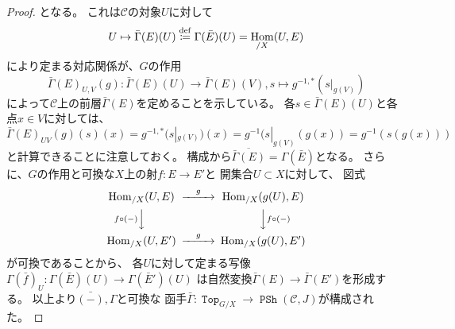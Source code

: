 \documentclass[uplatex]{jsarticle}
\theoremstyle{definition}
\DeclareMathOperator{\Hom}{Hom}
\def\mcC{\mathcal{C}}
\newcommand{\dfn}{\overset{\mathrm{\tiny def}}{\coloneqq}}
\DeclareMathOperator{\sfTop}{\mathtt{Top}}
\DeclareMathOperator{\PSh}{\mathtt{PSh}}
\begin{document}
\begin{proof}
  となる。
  これは\(\mcC\)の対象\(U\)に対して
  \[
  U\mapsto \bar{\Gamma}(E)(U) \dfn \Gamma(\bar{E})(U) = \Hom_{/X}(U,E)
  \]
  により定まる対応関係が、\(G\)の作用
  \[
  \bar{\Gamma}(E)_{U,V}(g):
  \bar{\Gamma}(E)(U) \to \bar{\Gamma}(E)(V), s\mapsto g^{-1,*}(s|_{g(V)})
  \]
  によって\(\mcC\)上の前層\(\bar{\Gamma}(E)\)を定めることを示している。
  各\(s\in \bar{\Gamma}(E)(U)\)と各点\(x\in V\)に対しては、
  \begin{equation}
    \label{eq: prob: 0.9}
    \bar{\Gamma}(E)_{UV}(g)(s)(x) = g^{-1,*}(s|_{g(V)})(x)
    = g^{-1}(s|_{g(V)}(g(x)) = g^{-1}(s(g(x)))
    \tag{\(\dagger\)}
  \end{equation}
  と計算できることに注意しておく。
  構成から\(\overline{\bar{\Gamma}(E)} = \Gamma(\bar{E})\)となる。
  さらに、\(G\)の作用と可換な\(X\)上の射\(f:E\to E'\)と
  開集合\(U\subset X\)に対して、
  図式
  \[
  \begin{CD}
    \Hom_{/X}(U,E) @>g>> \Hom_{/X}(g(U),E) \\
    @V {f\circ(-)} VV @VV {f\circ(-)} V \\
    \Hom_{/X}(U,E') @>g>> \Hom_{/X}(g(U),E')
  \end{CD}
  \]
  が可換であることから、
  各\(U\)に対して定まる写像
  \(\Gamma(\bar{f})_U:\Gamma(\bar{E})(U) \to \Gamma(\bar{E}')(U)\)
  は自然変換\(\bar{\Gamma}(E)\to \bar{\Gamma}(E')\)を形成する。
  以上より\(\bar{(-)}, \Gamma\)と可換な
  函手\(\bar{\Gamma}:\sfTop_{G/X} \to \PSh(\mcC,J)\)が構成された。



\end{proof}
\end{document}
